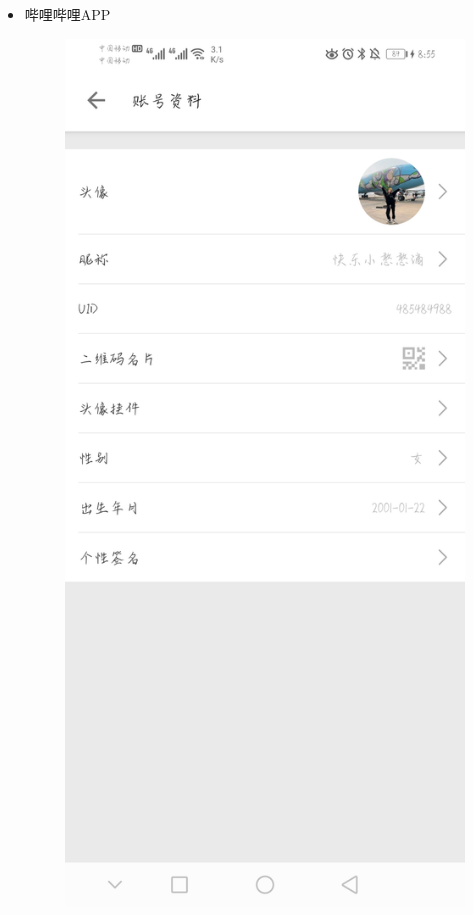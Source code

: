 \documentclass{article}
\begin{document}
\begin{itemize}
  
   \item 哔哩哔哩APP\par
    \begin{figure}[h!]
    	\centering
    	\includegraphics[scale=0.1]{a}
    	\caption{}
    	\label{fig:a}
    \end{figure}
    

\end{itemize}
\end{document}
